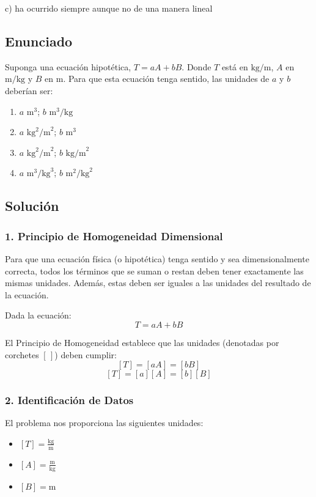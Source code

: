 \documentclass[12pt, a4paper]{article}
\begin{document}
\begin{tcolorbox}[colback=green!5!white, colframe=green!50!black, title=Respuesta Final]
\centering \Large c) ha ocurrido siempre aunque no de una manera lineal
\end{tcolorbox}

\newpage


\subsection*{Enunciado}
Suponga una ecuación hipotética, $T = a A + b B$. Donde $T$ está en $\text{kg/m}$, $A$ en $\text{m/kg}$ y $B$ en $\text{m}$. Para que esta ecuación tenga sentido, las unidades de $a$ y $b$ deberían ser:
\begin{enumerate}[label=\alph*)]
    \item $a \text{ m}^3$; $b \text{ m}^3\text{/kg}$
    \item $a \text{ kg}^2\text{/m}^2$; $b \text{ m}^3$
    \item $a \text{ kg}^2\text{/m}^2$; $b \text{ kg/m}^2$
    \item $a \text{ m}^3\text{/kg}^3$; $b \text{ m}^2\text{/kg}^2$
\end{enumerate}

\subsection*{Solución}

\subsubsection*{1. Principio de Homogeneidad Dimensional}
Para que una ecuación física (o hipotética) tenga sentido y sea dimensionalmente correcta, todos los términos que se suman o restan deben tener exactamente las mismas unidades. Además, estas deben ser iguales a las unidades del resultado de la ecuación.

Dada la ecuación:
$$ T = a A + b B $$

El Principio de Homogeneidad establece que las unidades (denotadas por corchetes $[\,]$) deben cumplir:
$$ [T] = [aA] = [bB] $$
$$ [T] = [a][A] = [b][B] $$

\subsubsection*{2. Identificación de Datos}
El problema nos proporciona las siguientes unidades:
\begin{itemize}
    \item $[T] = \frac{\text{kg}}{\text{m}}$
    \item $[A] = \frac{\text{m}}{\text{kg}}$
    \item $[B] = \text{m}$
\end{itemize}
\end{document}
